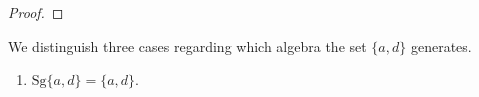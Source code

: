 \documentclass[11pt]{amsart}
\theoremstyle{definition}
\theoremstyle{remark}
\theoremstyle{plain}
\begin{document}
\begin{enumerate}[wide, labelindent=0pt]
\begin{proof}
\end{proof}
We distinguish three cases regarding which algebra the set $\{a,d\}$ generates.
\begin{enumerate}[wide, labelindent=0pt]
    \item[\textsc{\textbf{Subcase 2.1}}] $\mathrm{Sg}\{a,d\}=\{a,d\}$.
    

\end{enumerate}
\end{enumerate}
\end{document}
